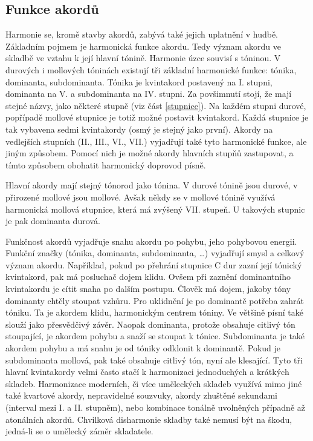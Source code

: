 \subsection{Funkce akordů}
Harmonie se, kromě stavby akordů, zabývá také jejich uplatnění v hudbě.
Základním pojmem je harmonická funkce akordu.
Tedy význam akordu ve skladbě ve vztahu k její hlavní tónině.
Harmonie úzce souvisí s tóninou.
V durových i mollových tóninách existují tři základní harmonické funkce: 
tónika, dominanta, subdominanta.
Tónika je kvintakord postavený na I. stupni, dominanta na V. a subdominanta na IV. stupni.
Za povšimnutí stojí, že mají stejné názvy, jako některé stupně  
(viz část \ref{stupnice}).
Na každém stupni durové, popřípadě mollové stupnice je totiž možné postavit kvintakord.
Každá stupnice je tak vybavena sedmi kvintakordy 
(osmý je stejný jako první).
Akordy na vedlejších stupních (II., III., VI., VII.)
vyjadřují také tyto harmonické funkce, ale jiným způsobem.
Pomocí nich je možné akordy hlavních stupňů zastupovat,
a tímto způsobem obohatit harmonický doprovod písně.
\cite{kofron,zenkl}
\par

Hlavní akordy mají stejný tónorod jako tónina.
V durové tónině jsou durové, v přirozené mollové jsou mollové.
Avšak někdy se v mollové tónině využívá harmonická mollová stupnice,
která má zvýšený VII. stupeň.
U takových stupnic je pak dominanta durová.
\cite{kofron}
\par

Funkčnost akordů vyjadřuje snahu akordu po pohybu, jeho pohybovou energii.
Funkční značky (tónika, dominanta, subdominanta, \dots) 
vyjadřují smysl a celkový význam akordu.
Například, pokud po přehrání stupnice C dur zazní její tónický kvintakord,
pak má posluchač dojem klidu.
Ovšem při zaznění dominantního kvintakordu je cítit snaha po dalším postupu.
Člověk má dojem, jakoby tóny dominanty chtěly stoupat vzhůru.
Pro uklidnění je po dominantě potřeba zahrát tóniku.
Ta je akordem klidu, harmonickým centrem tóniny.
\cite{kofron}
Ve většině písní také slouží jako přesvědčivý závěr.
\cite{zenkl}
Naopak dominanta, protože obsahuje citlivý tón stoupající, 
je akordem pohybu a snaží se stoupat k tónice.
\cite{kofron}
Subdominanta je také akordem pohybu 
a má snahu je od tóniky odklonit k dominantě.
\cite{zenkl}
Pokud je subdominanta mollová, pak také obsahuje citlivý tón, 
nyní ale klesající.
Tyto tři hlavní kvintakordy velmi často stačí 
k harmonizaci jednoduchých a krátkých skladeb.
\cite{kofron}
Harmonizace moderních, či více uměleckých skladeb využívá mimo jiné
také kvartové akordy, nepravidelné souzvuky,
akordy zhuštěné sekundami (interval mezi I. a II. stupněm), nebo
kombinace tonálně uvolněných případně až atonálních akordů.
Chvilková disharmonie skladby také nemusí být na škodu,
jedná-li se o umělecký záměr skladatele.
\cite{zenkl}
\par

